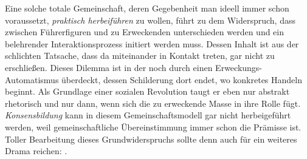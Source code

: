 Eine solche totale Gemeinschaft, deren Gegebenheit man ideell immer schon
voraussetzt, \emph{praktisch herbeiführen} zu wollen, führt zu dem Widerspruch,
dass zwischen Führerfiguren und zu Erweckenden unterschieden werden und ein
belehrender Interaktionsprozess initiert werden muss. Dessen Inhalt ist aus
der schlichten Tatsache, dass da \Cite{Menschen} miteinander in Kontakt
treten, gar nicht zu erschließen. Dieses Dilemma ist in der
 noch durch einen Erweckungs-Automatismus überdeckt, dessen
Schilderung dort endet, wo konkretes Handeln beginnt. Als Grundlage einer
sozialen Revolution taugt er eben nur abstrakt rhetorisch und nur
dann, wenn sich die zu erweckende Masse in ihre Rolle fügt.  
\emph{Konsensbildung} kann in diesem Gemeinschaftsmodell gar nicht
herbeigeführt werden, weil gemeinschaftliche Übereinstimmung immer schon
die Prämisse ist. Toller Bearbeitung dieses Grundwiderspruchs 
sollte denn auch für ein weiteres Drama reichen: .









